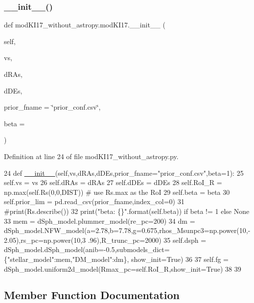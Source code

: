 \subsubsection{\texorpdfstring{\+\_\+\+\_\+init\+\_\+\+\_\+()}{\_\_init\_\_()}}
{\footnotesize\ttfamily def mod\+K\+I17\+\_\+without\+\_\+astropy.\+mod\+K\+I17.\+\_\+\+\_\+init\+\_\+\+\_\+ (\begin{DoxyParamCaption}\item[{}]{self,  }\item[{}]{vs,  }\item[{}]{d\+R\+As,  }\item[{}]{d\+D\+Es,  }\item[{}]{prior\+\_\+fname = {\ttfamily \char`\"{}prior\+\_\+conf.csv\char`\"{}},  }\item[{}]{beta = {} }\end{DoxyParamCaption})}



Definition at line 24 of file mod\+K\+I17\+\_\+without\+\_\+astropy.\+py.


\begin{DoxyCode}
24     \textcolor{keyword}{def }\hyperlink{classsampler_1_1Sampler_a0ebbb93e5c948bc426658cbdc92bfd12}{\_\_init\_\_}(self,vs,dRAs,dDEs,prior\_fname="prior\_conf.csv",beta=1):
25         self.vs = vs
26         self.dRAs = dRAs
27         self.dDEs = dDEs
28         self.RoI\_R = np.max(self.Rs(0,0,DIST)) \textcolor{comment}{# use Rs.max as the RoI}
29         self.beta = beta
30         self.prior\_lim = pd.read\_csv(prior\_fname,index\_col=0)
31         \textcolor{comment}{#print(Rs.describe())}
32         print(\textcolor{stringliteral}{"beta: \{\}"}.format(self.beta)) \textcolor{keywordflow}{if} beta != 1 \textcolor{keywordflow}{else} \textcolor{keywordtype}{None}
33         mem = dSph\_model.plummer\_model(re\_pc=200)
34         dm = dSph\_model.NFW\_model(a=2.78,b=7.78,g=0.675,rhos\_Msunpc3=np.power(10,-2.05),rs\_pc=np.power(10,3
      .96),R\_trunc\_pc=2000)
35         self.dsph = dSph\_model.dSph\_model(anib=-0.5,submodels\_dict=\{\textcolor{stringliteral}{"stellar\_model"}:mem,\textcolor{stringliteral}{"DM\_model"}:dm\},
      show\_init=\textcolor{keyword}{True})
36         
37         self.fg = dSph\_model.uniform2d\_model(Rmax\_pc=self.RoI\_R,show\_init=\textcolor{keyword}{True})
38 
39 
\end{DoxyCode}


\subsection{Member Function Documentation}
\mbox{\label{classmodKI17__without__astropy_1_1modKI17_aee859d09f6c45a00d6dfa09f40fcd474}} 
